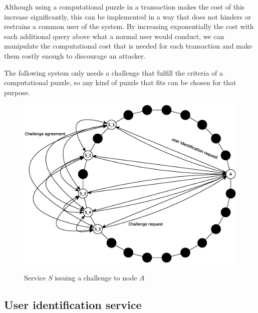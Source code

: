 
Although using a computational puzzle in a transaction makes the cost of this
increase significantly, this can be implemented in a way that does not hinders
or restrains a common user of the system.
By increasing exponentially the cost with each additional
query above what a normal user would conduct, we can manipulate the computational cost that is needed for each
transaction and make them costly enough to discourage an attacker.





 The following system only needs a challenge that fulfill the
criteria of a computational puzzle, so any kind of puzzle that fits can be chosen for
that purpose.


\begin{figure}[!htb]
\centering
\includegraphics[width=14cm]{../img/challenge}\\
\caption{Service $S$ issuing a  challenge to node $A$}
\label{fig:sign_in}
\end{figure}

\subsection{User identification service}
\label{sec:identificators}

